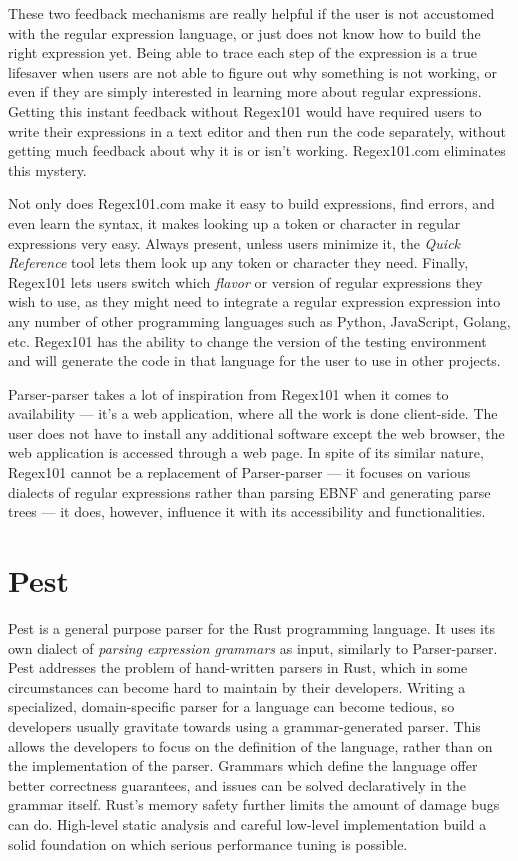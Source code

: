 \documentclass[english,engineering]{wizthesis}
\newcommand{\paraphrase}[1]{#1}
\newcommand{\thisproject}{Parser-parser}
\begin{document}
{These two feedback mechanisms are really helpful if the user is not accustomed
with the regular expression language, or just does not know how to build the
right expression yet. Being able to trace each step of the expression is a true
lifesaver when users are not able to figure out why something is not working, or
even if they are simply interested in learning more about regular expressions.
Getting this instant feedback without Regex101 would have required users to
write their expressions in a text editor and then run the code separately,
without getting much feedback about why it is or isn’t working. Regex101.com
eliminates this mystery.

Not only does Regex101.com make it easy to build expressions, find errors, and
even learn the syntax, it makes looking up a token or character in regular
expressions very easy. Always present, unless users minimize it, the \emph{Quick
Reference} tool lets them look up any token or character they need. Finally,
Regex101 lets users switch which \emph{flavor} or version of regular expressions
they wish to use, as they might need to integrate a regular expression
expression into any number of other programming languages such as Python,
JavaScript, Golang, etc. Regex101 has the ability to change the version of the
testing environment and will generate the code in that language for the user to
use in other projects.}

\thisproject{} takes a lot of inspiration from Regex101 when it comes to
availability --- it's a web application, where all the work is done client-side.
The user does not have to install any additional software except the web
browser, the web application is accessed through a web page. In spite of its
similar nature, Regex101 cannot be a replacement of \thisproject{} --- it
focuses on various dialects of regular expressions rather than parsing EBNF and
generating parse trees --- it does, however, influence it with its accessibility
and functionalities.

\section*{Pest}

Pest \cite{pest} is a general purpose parser for the Rust programming language.
It uses its own dialect of \emph{parsing expression grammars} as input,
similarly to \thisproject{}. Pest addresses the problem of hand-written parsers
in Rust, which in some circumstances can become hard to maintain by their
developers. Writing a specialized, domain-specific parser for a language can
become tedious, so developers usually gravitate towards using a
grammar-generated parser. This allows the developers to focus on the definition
of the language, rather than on the implementation of the parser.
\paraphrase{Grammars which define the language offer better correctness
guarantees, and issues can be solved declaratively in the grammar itself. Rust's
memory safety further limits the amount of damage bugs can do. High-level static
analysis and careful low-level implementation build a solid foundation on which
serious performance tuning is possible.}
\end{document}
